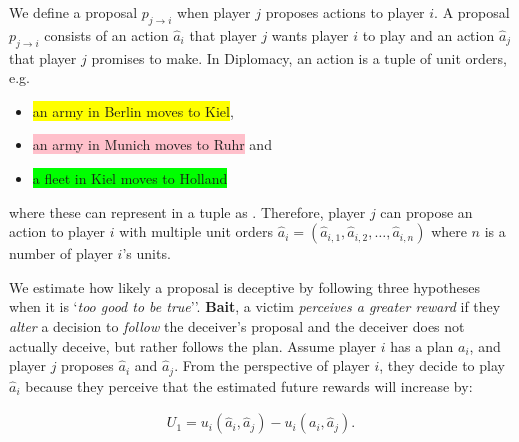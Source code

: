 We define a proposal \( p_{j\to i} \) when player \( j \) proposes actions to player \( i \). A proposal \( p_{j\to i} \) consists of an action \( \hat{a}_i \) that player \( j \) wants player \( i \) to play and an action \( \hat{a}_j \) that player \( j \) promises to make. In Diplomacy, an action is a tuple of unit orders, e.g. 
\begin{itemize}
    \item \colorbox{yellow}{an army in Berlin moves to Kiel},
    \item \colorbox{pink}{an army in Munich moves to Ruhr} and
    \item \colorbox{lime}{a fleet in Kiel moves to Holland}
\end{itemize} 
where these can represent in a tuple as .
Therefore, player \( j \) can propose an action to player \( i \) with multiple unit orders \( \hat{a}_i = (\hat{a}_{i,1} ,\hat{a}_{i,2}, \dots,  \hat{a}_{i,n}) \) where \( n \) is a number of player \( i \)'s units.   

We estimate how likely a proposal is deceptive by following three hypotheses when it is `\textit{too good to be true}''. \textbf{Bait},
a victim \textit{perceives a greater reward} if they \textit{alter} a decision to \textit{follow} the deceiver's proposal and the deceiver does not actually deceive, but rather follows the plan. 
Assume player \( i \) has a plan \( a_i\), and player \( j \) proposes \( \hat{a}_i \) and \( \hat{a}_j \). From the perspective of player \( i \), they decide to play \( \hat{a}_i \) because they perceive that the estimated future rewards will increase by: 

\begin{equation}
    \begin{aligned}
        U_1 = u_i(\hat{a}_i, \hat{a}_j) - u_i(a_i, \hat{a}_j).
    \end{aligned}
    \label{eq:deception_hypo3}
\end{equation}

